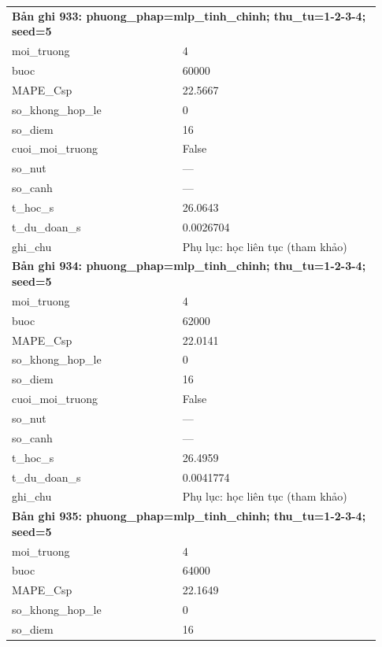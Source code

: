 \begin{longtable}{p{0.43\linewidth}p{0.50\linewidth}}
\midrule
\multicolumn{2}{p{0.95\linewidth}}{\textbf{Bản ghi 933: phuong\_phap=mlp\_tinh\_chinh; thu\_tu=1-2-3-4; seed=5}} \\
moi\_\allowbreak truong & 4 \\
buoc & 60000 \\
MAPE\_\allowbreak Csp & 22.5667 \\
so\_\allowbreak khong\_\allowbreak hop\_\allowbreak le & 0 \\
so\_\allowbreak diem & 16 \\
cuoi\_\allowbreak moi\_\allowbreak truong & False \\
so\_\allowbreak nut & — \\
so\_\allowbreak canh & — \\
t\_\allowbreak hoc\_\allowbreak s & 26.0643 \\
t\_\allowbreak du\_\allowbreak doan\_\allowbreak s & 0.0026704 \\
ghi\_\allowbreak chu & Phụ lục: học liên tục (tham khảo) \\
\midrule
\multicolumn{2}{p{0.95\linewidth}}{\textbf{Bản ghi 934: phuong\_phap=mlp\_tinh\_chinh; thu\_tu=1-2-3-4; seed=5}} \\
moi\_\allowbreak truong & 4 \\
buoc & 62000 \\
MAPE\_\allowbreak Csp & 22.0141 \\
so\_\allowbreak khong\_\allowbreak hop\_\allowbreak le & 0 \\
so\_\allowbreak diem & 16 \\
cuoi\_\allowbreak moi\_\allowbreak truong & False \\
so\_\allowbreak nut & — \\
so\_\allowbreak canh & — \\
t\_\allowbreak hoc\_\allowbreak s & 26.4959 \\
t\_\allowbreak du\_\allowbreak doan\_\allowbreak s & 0.0041774 \\
ghi\_\allowbreak chu & Phụ lục: học liên tục (tham khảo) \\
\midrule
\multicolumn{2}{p{0.95\linewidth}}{\textbf{Bản ghi 935: phuong\_phap=mlp\_tinh\_chinh; thu\_tu=1-2-3-4; seed=5}} \\
moi\_\allowbreak truong & 4 \\
buoc & 64000 \\
MAPE\_\allowbreak Csp & 22.1649 \\
so\_\allowbreak khong\_\allowbreak hop\_\allowbreak le & 0 \\
so\_\allowbreak diem & 16 \\

\end{longtable}
